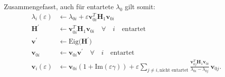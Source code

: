 
Zusammengefasst, auch für entartete $\lambda_0$ gilt somit:
\begin{align*}
    \lambda_i(\varepsilon)
    & \gets
    \lambda_{0i} + \varepsilon \bm v_{0i}^T \bm H_1 \bm v_{0i}\\
    \bm H^\prime & \gets \bm v_{0i}^T \bm H_1 \bm v_{0i} \quad \forall \quad i \quad \text{entartet} \\
    \bm v^\prime & \gets \mathrm{Eig} \Big( \bm H^\prime \Big) \\
    \bm v_{0i} & \gets \bm v_{0i} \bm v^\prime  \quad \forall \quad i \quad \text{entartet} \\
    \bm v_i(\varepsilon)
    & \gets
        \bm v_{0i} ( 1 + \mathrm{Im}(\varepsilon \gamma) ) + \varepsilon \sum_{j \neq i, \text{nicht entartet}}
        \frac{\bm v_{0j}^T \bm H_1 \bm v_{0i}}{\lambda_{0i} - \lambda_{0j}}
        \, \bm v_{0j}.
\end{align*}
